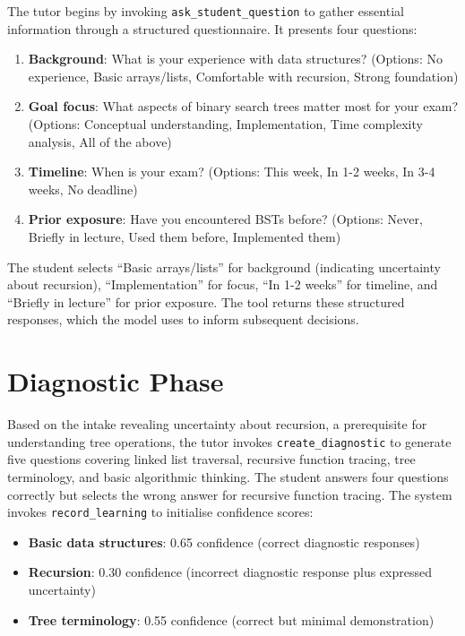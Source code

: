 \documentclass[logo,bsc,singlespacing,parskip,online]{infthesis}
\begin{document}
The tutor begins by invoking \texttt{ask\_student\_question} to gather essential information through a structured questionnaire. It presents four questions:

\begin{enumerate}
\item \textbf{Background}: What is your experience with data structures? (Options: No experience, Basic arrays/lists, Comfortable with recursion, Strong foundation)
\item \textbf{Goal focus}: What aspects of binary search trees matter most for your exam? (Options: Conceptual understanding, Implementation, Time complexity analysis, All of the above)
\item \textbf{Timeline}: When is your exam? (Options: This week, In 1-2 weeks, In 3-4 weeks, No deadline)
\item \textbf{Prior exposure}: Have you encountered BSTs before? (Options: Never, Briefly in lecture, Used them before, Implemented them)
\end{enumerate}

The student selects ``Basic arrays/lists'' for background (indicating uncertainty about recursion), ``Implementation'' for focus, ``In 1-2 weeks'' for timeline, and ``Briefly in lecture'' for prior exposure. The tool returns these structured responses, which the model uses to inform subsequent decisions.

\section{Diagnostic Phase}

Based on the intake revealing uncertainty about recursion, a prerequisite for understanding tree operations, the tutor invokes \texttt{create\_diagnostic} to generate five questions covering linked list traversal, recursive function tracing, tree terminology, and basic algorithmic thinking. The student answers four questions correctly but selects the wrong answer for recursive function tracing. The system invokes \texttt{record\_learning} to initialise confidence scores:

\begin{itemize}
\item \textbf{Basic data structures}: 0.65 confidence (correct diagnostic responses)
\item \textbf{Recursion}: 0.30 confidence (incorrect diagnostic response plus expressed uncertainty)
\item \textbf{Tree terminology}: 0.55 confidence (correct but minimal demonstration)
\end{itemize}
\end{document}
